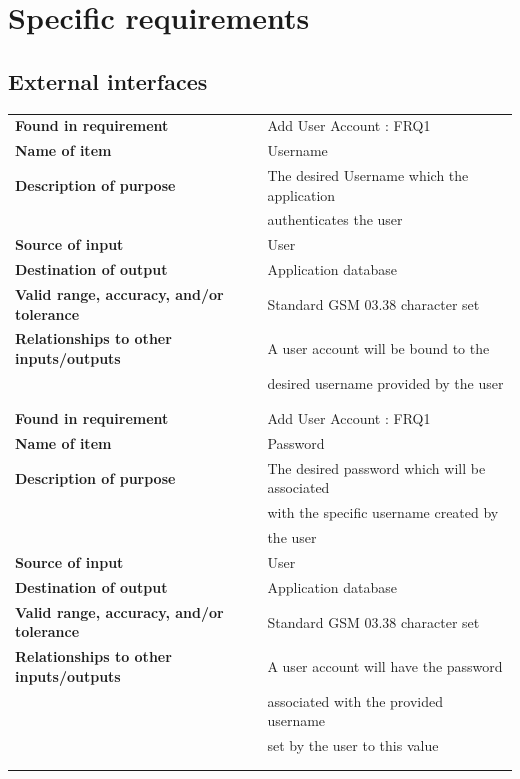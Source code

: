 \section{Specific requirements}

\subsection{External interfaces}
\begin{tabular}{ll}
\textbf{Found in requirement}&Add User Account : FRQ1\\
\textbf{Name of item}&Username\\
\textbf{Description of purpose}&The desired Username which the application\\& authenticates the user\\
\textbf{Source of input}&User\\
\textbf{Destination of output}&Application database\\
\textbf{Valid range, accuracy, and/or tolerance}&Standard GSM 03.38 character set\\
\textbf{Relationships to other inputs/outputs}&A user account will be bound to the\\& desired username provided by the user\\
&\\
&\\
\textbf{Found in requirement}&Add User Account : FRQ1\\
\textbf{Name of item}&Password\\
\textbf{Description of purpose}&The desired password which will be associated\\& with the specific username created by\\& the user\\
\textbf{Source of input}&User\\
\textbf{Destination of output}&Application database\\
\textbf{Valid range, accuracy, and/or tolerance}&Standard GSM 03.38 character set\\
\textbf{Relationships to other inputs/outputs}&A user account will have the password\\& associated with the provided username\\& set by the user to this value\\
&\\
&\\

\end{tabular}
